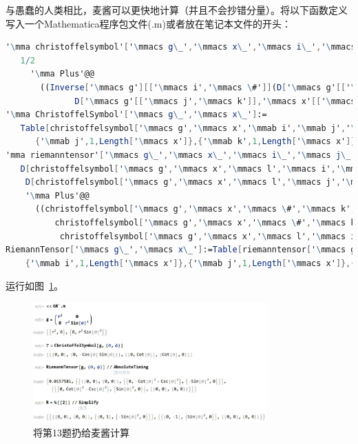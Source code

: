\begin{xiti}
\begin{jie}
		与愚蠢的人类相比，麦酱可以更快地计算（并且不会抄错分量）。将以下函数定义写入一个Mathematica程序包文件(.m)或者放在笔记本文件的开头：
		\begin{lstlisting}[language=Mathematica]
'\mma christoffelsymbol'['\mmacs g\_','\mmacs x\_','\mmacs i\_','\mmacs j\_','\mmacs k\_']:=
   1/2
     '\mma Plus'@@
       ((Inverse['\mmacs g'][['\mmacs i','\mmacs \#']](D['\mmacs g'[['\mmacs \#','\mmacs j']],'\mmacs x'[['\mmacs k']]]+D['\mmacs g'[['\mmacs k','\mmacs \#']],'\mmacs x'[['\mmacs j']]]-
              D['\mmacs g'[['\mmacs j','\mmacs k']],'\mmacs x'[['\mmacs \#']]]))&)/@'\mma Range'[Length['\mmacs x']];
'\mma ChristoffelSymbol'['\mmacs g\_','\mmacs x\_']:=
   Table[christoffelsymbol['\mmacs g','\mmacs x','\mmab i','\mmab j','\mmab k'],{'\mmab i',1,Length['\mmacs x']},
      {'\mmab j',1,Length['\mmacs x']},{'\mmab k',1,Length['\mmacs x']}];
'mma riemanntensor'['\mmacs g\_','\mmacs x\_','\mmacs i\_','\mmacs j\_','\mmacs k\_','\mmacs l\_']:=
   D[christoffelsymbol['\mmacs g','\mmacs x','\mmacs l','\mmacs i','\mmacs k'],'\mmacs x'[['\mmacs j']]]-
    D[christoffelsymbol['\mmacs g','\mmacs x','\mmacs l','\mmacs j','\mmacs k'],'\mmacs x'[['\mmacs i']]]+
    '\mma Plus'@@
      ((christoffelsymbol['\mmacs g','\mmacs x','\mmacs \#','\mmacs k','\mmacs i'] christoffelsymbol['\mmacs g','\mmacs x','\mmacs l','\mmacs j','\mmacs \#']-
          christoffelsymbol['\mmacs g','\mmacs x','\mmacs \#','\mmacs k','\mmacs j']
           christoffelsymbol['\mmacs g','\mmacs x','\mmacs l','\mmacs i','\mmacs \#'])&)/@Range[Length['\mmacs x']];
RiemannTensor['\mmacs g\_','\mmacs x\_']:=Table[riemanntensor['\mmacs g','\mmacs x','\mmab i','\mmab j','\mmab k','\mmab l'],
    {'\mmab i',1,Length['\mmacs x']},{'\mmab j',1,Length['\mmacs x']},{'\mmab k',1,Length['\mmacs x']},{'\mmab l',1,Length['\mmacs x']}];
		\end{lstlisting}
		运行如图~\ref{f3.1}。
		\begin{figure}[htb]
			\centering
			\includegraphics[width=0.8\textwidth]{pictures/1}
			\caption{将第13题扔给麦酱计算}\label{f3.1}
		\end{figure}
	\end{jie}
	

\end{xiti}
